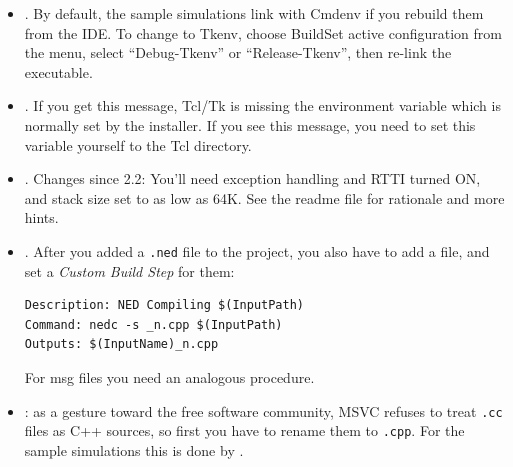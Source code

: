 \begin{itemize}
 \item {}. By default,
   the sample simulations link with Cmdenv if you rebuild them
   from the IDE. To change to Tkenv, choose Build{\textbar}Set
   active configuration from the menu, select ``Debug-Tkenv''
   or ``Release-Tkenv'', then re-link the executable.

 \item {}. If you get this message,
   Tcl/Tk is missing the  environment variable
   which is normally set by the installer. If you see this message,
   you need to set this variable yourself to the Tcl  directory.

 \item {}. Changes since {\opp} 2.2:
   You'll need exception handling and RTTI turned ON, and
   stack size set to as low as 64K.
   See the readme file for rationale and more hints.

 \item {}. After you added a \texttt{.ned} file
   to the project, you also have to add a  file, and set a
   \textit{Custom Build Step} for them:

\begin{verbatim}
Description: NED Compiling $(InputPath)
Command: nedc -s _n.cpp $(InputPath)
Outputs: $(InputName)_n.cpp
\end{verbatim}

   For msg files you need an analogous procedure.

 \item {}: as a gesture toward the free software
   community, MSVC refuses to treat \texttt{.cc} files as C++ sources,
   so first you have to rename them to \texttt{.cpp}.
   For the sample simulations this is done by .

\end{itemize}


%
%
%
%
%


